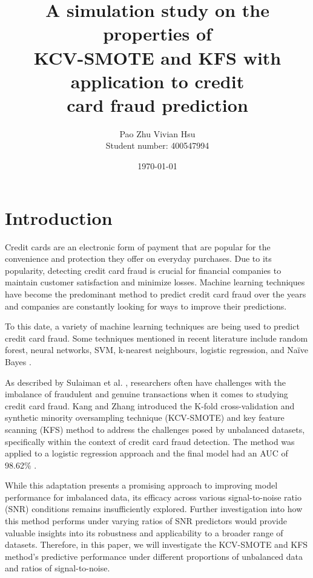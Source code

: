 \documentclass[a4paper, 12pt]{article}
\title{A simulation study on the properties of \\
    KCV-SMOTE and KFS with application to credit \\
    card fraud prediction}
\author{Pao Zhu Vivian Hsu \\ Student number: 400547994}
\date{\today}
\begin{document}
		
		
\maketitle
		
		
\newpage
		
\section{Introduction}

Credit cards are an electronic form of payment that are popular for the convenience and protection they offer on everyday purchases. Due to its popularity, detecting credit card fraud is crucial for financial companies to maintain customer satisfaction and minimize losses. Machine learning techniques have become the predominant method to predict credit card fraud over the years and companies are constantly looking for ways to improve their predictions. 

To this date, a variety of machine learning techniques are being used to predict credit card fraud. Some techniques mentioned in recent literature include random forest, neural networks, SVM, k-nearest neighbours, logistic regression, and Naïve Bayes \cite{litReviewSulaiman, litReviewItoo}.

As described by Sulaiman et al. \cite{litReviewSulaiman}, researchers often have challenges with the imbalance of fraudulent and genuine transactions when it comes to studying credit card fraud. Kang and Zhang \cite{kcvSmoteStudy} introduced the K-fold cross-validation and synthetic minority oversampling technique (KCV-SMOTE) and key feature scanning (KFS) method to address the challenges posed by unbalanced datasets, specifically within the context of credit card fraud detection. The method was applied to a logistic regression approach and the final model had an AUC of 98.62\% \cite{kcvSmoteStudy}.

While this adaptation presents a promising approach to improving model performance for imbalanced data, its efficacy across various signal-to-noise ratio (SNR) conditions remains insufficiently explored. Further investigation into how this method performs under varying ratios of SNR predictors would provide valuable insights into its robustness and applicability to a broader range of datasets. Therefore, in this paper, we will investigate the KCV-SMOTE and KFS method's predictive performance under different proportions of unbalanced data and ratios of signal-to-noise.
	
\end{document}
